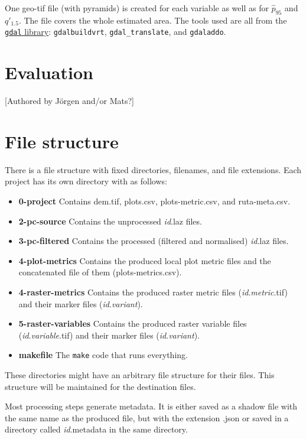 \documentclass[english,a4paper,minion,nofigsidecaption]{article}
\newcommand{\file}[1]{\textsf{#1}}
\newcommand{\id}{\emph{id}}
\newcommand{\first}[1]{\ensuremath{\hat{#1}}}
\newcommand{\perc}[1]{\ensuremath{\first{p}_{#1}}}
\newcommand{\prop}[1]{\ensuremath{q'_{#1}}}
\begin{document}
One geo-tif file (with pyramids) is created for each variable as well as for \perc{95} and \prop{1.5}. The file covers the whole estimated area. 
The tools used are all from the \href{https://gdal.org}{\texttt{gdal} library}: \verb|gdalbuildvrt|, \verb|gdal_translate|, and \verb|gdaladdo|.


\newpage
\section{Evaluation}

[Authored by Jörgen and/or Mats?]




\section{File structure}

There is a file structure with fixed directories, filenames, and file extensions.
Each project has its own directory with as follows:
\begin{itemize}
	\item\file{\textbf{0-project}} Contains \file{dem.tif}, \file{plots.csv}, \file{plots-metric.csv}, and \file{ruta-meta.csv}.
	\item\file{\textbf{2-pc-source}} Contains the unprocessed \file{{\id}.laz} files.
	\item\file{\textbf{3-pc-filtered}} Contains the processed (filtered and normalised) \file{{\id}.laz} files.
	\item\file{\textbf{4-plot-metrics}} Contains the produced local plot metric files and the concatenated file of them (\file{plots-metrics.csv}). 
	\item\file{\textbf{4-raster-metrics}} Contains the produced raster metric files (\file{{\id}.\emph{metric}.tif}) and their marker files (\file{{\id}.\emph{variant}}). 
	\item\file{\textbf{5-raster-variables}} Contains the produced raster variable files (\file{{\id}.\emph{variable}.tif}) and their marker files (\file{{\id}.\emph{variant}}). 
	\item\file{\textbf{makefile}} The \texttt{make} code that runs everything. 
\end{itemize}
These directories might have an arbitrary file structure for their files. This structure will be maintained for the destination files. 

Most processing steps generate metadata. It is either saved as a shadow file with the same name as the produced file, but with the extension \file{.json} or saved in a directory called \file{{\id}.metadata} in the same directory. 
\end{document}
